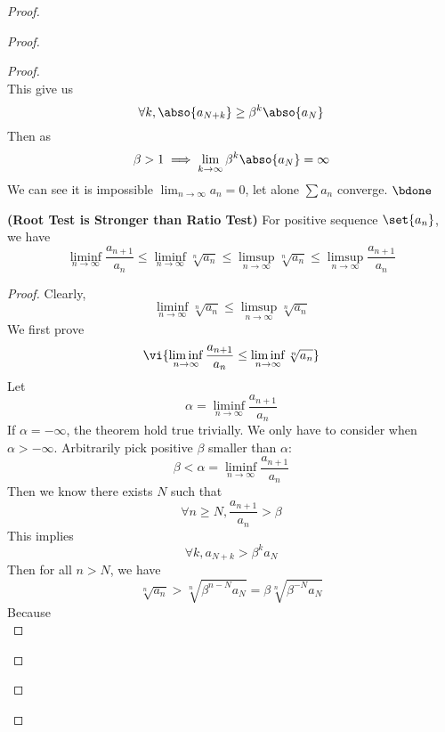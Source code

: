\documentclass{report}
\begin{document}
\begin{proof}
\begin{proof}
\begin{proof}
\begin{equation*}
\end{equation*}
This give us
\begin{equation*}
\forall k, \abso{a_{N+k}}\geq \beta^k \abso{a_N}
\end{equation*}
Then as 
\begin{equation*}
\beta >1\implies \lim_{k\to\infty}\beta ^k\abso{a_N}=\infty
\end{equation*}
We can see it is impossible $\lim_{n\to\infty}a_n=0$, let alone $\sum a_n$ converge. $\bdone$
\begin{theorem}
\label{4.6.3}
\textbf{(Root Test is Stronger than Ratio Test)} For positive sequence $\set{a_n}$, we have
\begin{equation*}
\liminf_{n\to\infty}\frac{a_{n+1}}{a_n}\leq \liminf_{n\to\infty} \sqrt[n]{a_n} \leq \limsup_{n\to\infty} \sqrt[n]{a_n} \leq \limsup_{n\to\infty} \frac{a_{n+1}}{a_n}
\end{equation*}
\end{theorem}
\begin{proof}
Clearly, 
\begin{equation*}
\liminf_{n\to\infty} \sqrt[n]{a_n}\leq \limsup_{n\to\infty} \sqrt[n]{a_n}  
\end{equation*}
We first prove
\begin{equation*}
  \vi{\liminf_{n\to\infty} \frac{a_{n+1}}{a_n}\leq \liminf_{n\to\infty} \sqrt[n]{a_n}}
\end{equation*}
Let 
\begin{equation*}
\alpha =\liminf_{n\to\infty} \frac{a_{n+1}}{a_n}
\end{equation*}
If $\alpha =-\infty$, the theorem hold true trivially. We only have to consider when $\alpha >-\infty$. Arbitrarily pick positive $\beta $ smaller than $\alpha $:
\begin{equation*}
\beta <\alpha=\liminf_{n\to\infty} \frac{a_{n+1}}{a_n}
\end{equation*}
Then we know there exists $N$ such that
 \begin{equation*}
\forall n\geq N, \frac{a_{n+1}}{a_n}>\beta 
\end{equation*}
This implies 
\begin{equation*}
\forall k, a_{N+k}>\beta^k a_N
\end{equation*}
Then for all $n>N$, we have
 \begin{equation*}
   \sqrt[n]{a_n}>\sqrt[n]{ \beta^{n-N}a_{N}}=\beta \sqrt[n]{\beta^{-N}a_N} 
\end{equation*}
Because 
\begin{equation*}

\end{equation*}
\end{proof}
\end{proof}
\end{proof}
\end{proof}
\end{document}
